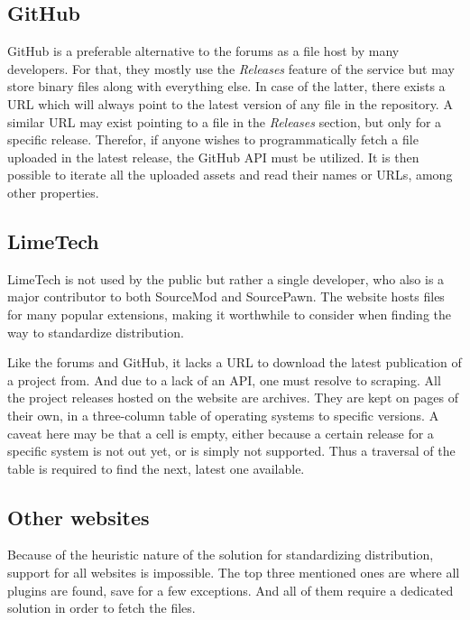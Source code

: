 \subsection{GitHub}

GitHub is a preferable alternative to the forums as a file host by many developers.
For that, they mostly use the \textit{Releases} feature of the service but may store binary files along with everything else.
In case of the latter, there exists a URL which will always point to the latest version of any file in the repository.
A similar URL may exist pointing to a file in the \textit{Releases} section, but only for a specific release.
Therefor, if anyone wishes to programmatically fetch a file uploaded in the latest release, the GitHub API must be utilized.
It is then possible to iterate all the uploaded assets and read their names or URLs, among other properties.

\subsection{LimeTech}

LimeTech is not used by the public but rather a single developer, who also is a major contributor to both SourceMod and SourcePawn.
The website hosts files for many popular extensions, making it worthwhile to consider when finding the way to standardize distribution.

Like the forums and GitHub, it lacks a URL to download the latest publication of a project from.
And due to a lack of an API, one must resolve to scraping.
All the project releases hosted on the website are archives.
They are kept on pages of their own, in a three-column table of operating systems to specific versions.
A caveat here may be that a cell is empty, either because a certain release for a specific system is not out yet, or is simply not supported.
Thus a traversal of the table is required to find the next, latest one available.

\subsection{Other websites}

Because of the heuristic nature of the solution for standardizing distribution, support for all websites is impossible.
The top three mentioned ones are where all plugins are found, save for a few exceptions.
And all of them require a dedicated solution in order to fetch the files.

